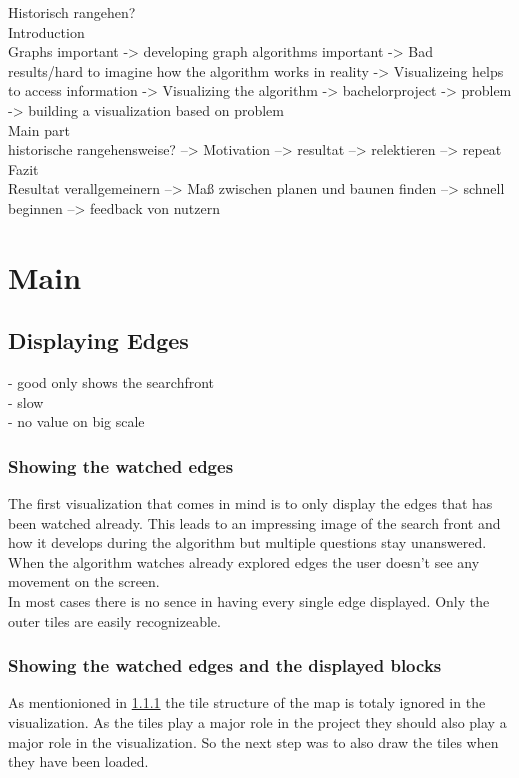 \documentclass
[
	paper = a4,
    pagesize,
	12 pt,
	oneside,                       %
    open = right,
	DIV = calc,
	BCOR = 0 mm,                   %
	bibtotoc
]
{scrbook}
\begin{document}
Historisch rangehen?\\

Introduction\\
Graphs important -> developing graph algorithms important -> Bad results/hard to imagine how the algorithm works in reality -> Visualizeing helps to access information -> Visualizing the algorithm -> bachelorproject -> problem -> building a visualization based on problem\\
Main part\\
historische rangehensweise? --> Motivation --> resultat --> relektieren --> repeat\\
Fazit\\
Resultat verallgemeinern --> Maß zwischen planen und baunen finden --> schnell beginnen --> feedback von nutzern\\

\chapter{Main}

\section{Displaying Edges}
- good only shows the searchfront\\
- slow\\
- no value on big scale\\
\subsection{Showing the watched edges} \label{edges only}

The first visualization that comes in mind is to only display the edges that has been watched already. This leads to an impressing image of the search front and how it develops during the algorithm but multiple questions stay unanswered.\\
When the algorithm watches already explored edges the user doesn't see any movement on the screen.\\
In most cases there is no sence in having every single edge displayed.
Only the outer tiles are easily recognizeable.

\subsection{Showing the watched edges and the displayed blocks}
As mentionioned in \ref{edges only} the tile structure of the map is totaly ignored in the visualization. As the tiles play a major role in the project they should also play a major role in the visualization.
So the next step was to also draw the tiles when they have been loaded.
\end{document}
